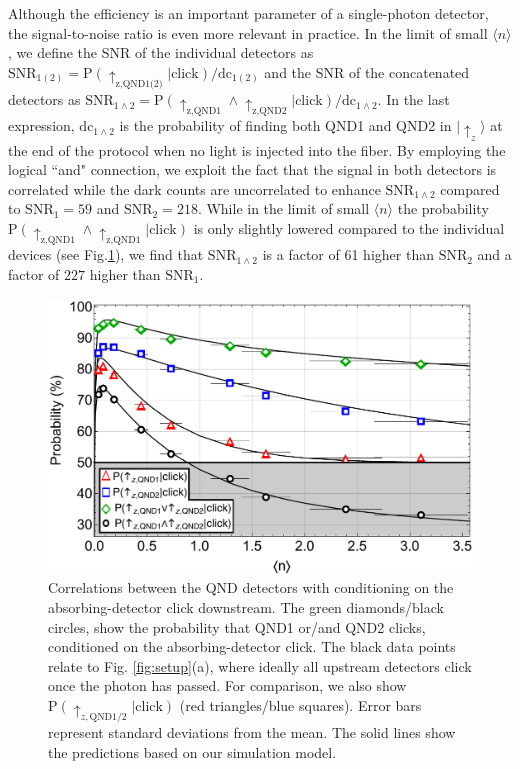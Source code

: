 \documentclass[prl,amsmath,amssymb,bibnotes,aps,longbibliography,12pt]{revtex4-1}
\newcommand{\ket}[1]{|{#1}\rangle}
\newcommand{\braket}[1]{\langle{#1}\rangle}
\begin{document}
Although the efficiency is an important parameter of a single-photon detector, the signal-to-noise ratio is even more relevant in practice. In the limit of small $\braket{n}$, we define the SNR of the individual detectors as $\text{SNR}_{1(2)}=\text{P}(\uparrow_{\text{z,QND1(2)}}\vert\text{click})/\text{dc}_{1(2)}$ and the SNR of the concatenated detectors as $\text{SNR}_{1\land2}=\text{P}(\uparrow_{\text{z,QND1}}\land\uparrow_{\text{z,QND2}}\vert\text{click})/\text{dc}_{1\land2}$. In the last expression, $\text{dc}_{1\land2}$ is the probability of finding both QND1 and QND2 in $\ket{\uparrow_z}$ at the end of the protocol when no light is injected into the fiber. By employing the logical ``and" connection, we exploit the fact that the signal in both detectors is correlated while the dark counts are uncorrelated to enhance $\text{SNR}_{1\land2}$ compared to $\text{SNR}_{1}=59$ and $\text{SNR}_{2}=218$. While in the limit of small $\braket{n}$ the probability $\text{P}(\uparrow_{\text{z,QND1}}\land\uparrow_{\text{z,QND1}}\vert\text{click})$ is only slightly lowered compared to the individual devices (see Fig.\ref{fig:efficiency}), we find that $\text{SNR}_{1\land2}$ is a factor of 61 higher than $\text{SNR}_2$ and a factor of $227$ higher than $\text{SNR}_1$.
\begin{figure}[t]
\centering
\includegraphics[width=\columnwidth]{Fig3.pdf}
\caption{\label{fig:efficiency} Correlations between the QND detectors with conditioning on the absorbing-detector click downstream. The green diamonds/black circles, show the probability that QND1 or/and QND2 clicks, conditioned on the absorbing-detector click. The black data points relate to Fig. \ref{fig:setup}(a), where ideally all upstream detectors click once the photon has passed. For comparison, we also show $\text{P}(\uparrow_{z,\text{QND1/2}}\vert\text{click})$ (red triangles/blue squares). Error bars represent standard deviations from the mean. The solid lines show the predictions based on our simulation model.}
\end{figure}
\end{document}

